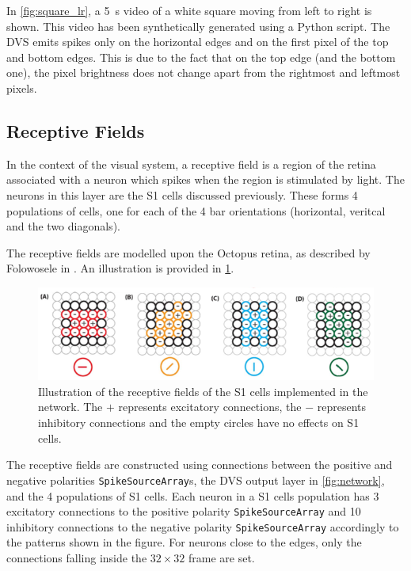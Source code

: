 In \cref{fig:square_lr}, a \SI{5}{s} video of a white square moving from left to right is shown. This video has been synthetically generated using a Python script. The DVS emits spikes only on the horizontal edges and on the first pixel of the top and bottom edges. This is due to the fact that on the top edge (and the bottom one), the pixel brightness does not change apart from the rightmost and leftmost pixels.

\subsection{Receptive Fields}
In the context of the visual system, a receptive field is a region of the retina associated with a neuron which spikes when the region is stimulated by light. The neurons in this layer are the \textsc{S1} cells discussed previously. These forms 4 populations of cells, one for each of the 4 bar orientations (horizontal, veritcal and the two diagonals). 

The receptive fields are modelled upon the Octopus retina, as described by Folowosele in \cite{Folowosele2011}. An illustration is provided in \cref{fig:receptive_fields}.

\begin{figure}[ht]
\centering
\includegraphics[scale=0.6]{images/development/receptive_fields.png}
\caption[Receptive Fields]{Illustration of the receptive fields of the \textsc{S1} cells implemented in the network. The $+$ represents excitatory connections, the $-$ represents inhibitory connections and the empty circles have no effects on \textsc{S1} cells.}
\label{fig:receptive_fields}
\end{figure}

The receptive fields are constructed using connections between the positive and negative polarities \texttt{SpikeSourceArray}s, the DVS output layer in \cref{fig:network}, and the 4 populations of \textsc{S1} cells. Each neuron in a \textsc{S1} cells population has 3 excitatory connections to the positive polarity \texttt{SpikeSourceArray} and 10 inhibitory connections to the negative polarity \texttt{SpikeSourceArray} accordingly to the patterns shown in the figure. For neurons close to the edges, only the connections falling inside the $32 \times 32$ frame are set.

